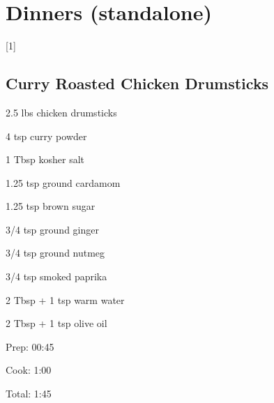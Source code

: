 \documentclass[oneside]{book}  %
\def\thisrecipe{}  %
\newcommand{\chapterrec}[1]{  %
  \newpage \def\thisrecipe{} \chapter{#1} \vspace{1.1em}
}
\newcommand{\chaptertoc}[1]{  %
  \chapterrec{#1} \vspace{-1.1em}  %
  \startcontents[chapters] \printcontents[chapters]{chapter_toc_}{1}[1]{}
}
\newcommand{\recipe}[1]{\section{#1}\def\thisrecipe{: #1}} %
\begin{document}
\chaptertoc{Dinners (standalone)} \label{chap:dinners_standalone}
\recipe{Curry Roasted Chicken Drumsticks} \label{recipe:curry_roasted_chicken_drumsticks} %

\begin{IT}
  \begin{ingredients}
    \item[2.5 lbs] chicken drumsticks
    \item[4 tsp] curry powder
    \item[1 Tbsp] kosher salt
    \item[1.25 tsp] ground cardamom
    \item[1.25 tsp] brown sugar
    \item[3/4 tsp] ground ginger
    \item[3/4 tsp] ground nutmeg
    \item[3/4 tsp] smoked paprika
    \item[2 Tbsp + 1 tsp] warm water
    \item[2 Tbsp + 1 tsp] olive oil
  \end{ingredients}

  \switchcolumn

  \begin{timeline}
    \item[Prep:]  00:45
    \item[Cook:]  1:00
    \item[Total:] 1:45
  \end{timeline}
\end{IT}
\end{document}

